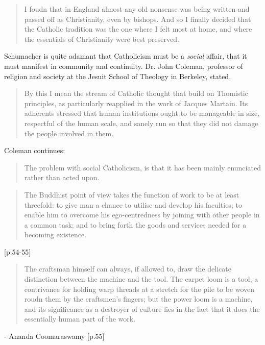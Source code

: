 \documentclass[letterpaper]{article}
\begin{document}
\begin{quote}
I foudn that in England almost any old nonsense was being written and passed off as Christianity, even by bishops. And so I finally decided that the Catholic tradition was the one where I felt most at home, and where the essentials of Christianity were best preserved.
\end{quote}

Schumacher is quite adamant that Catholicism must be a \textit{social} affair, that it must manifest in community and continuity. Dr. John Coleman, professor of religion and society at the Jesuit School of Theology in Berkeley, stated,

\begin{quote}
By this I mean the stream of Catholic thought that build on Thomistic principles, as particularly reapplied in the work of Jacques Martain. Its adherents stressed that human institutions ought to be manageable in size, respectful of the human scale, and sanely run so that they did not damage the people involved in them.
\end{quote}


Coleman continues:

\begin{quote}
The problem with social Catholicism, is that it has been mainly enunciated rather than acted upon.
\end{quote}










\begin{quote}
The Buddhist point of view takes the function of work to be at least threefold: to give man a chance to utilise and develop his faculties; to enable him to overcome his ego-centredness by joining with other people in a common task; and to bring forth the goods and services needed for a becoming existence.
\end{quote} [p.54-55]

\begin{quote}
The craftsman himself can always, if allowed to, draw the delicate distinction between the machine and the tool. The carpet loom is a tool, a contrivance for holding warp threads at a stretch for the pile to be woven roudn them by the craftsmen's fingers; but the power loom is a machine, and its significance as a destroyer of culture lies in the fact that it does the essentially human part of the work.
\end{quote} - Ananda Coomaraswamy [p.55]
\end{document}
